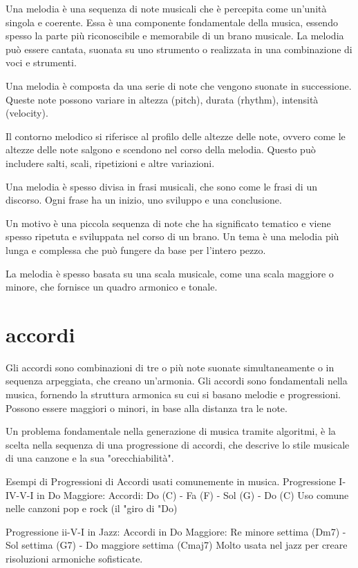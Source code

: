 \documentclass[a4paper,12pt]{report}
\begin{document}
Una melodia è una sequenza di note musicali che è percepita come un'unità singola e coerente. 
Essa è una componente fondamentale della musica, essendo spesso la parte più riconoscibile e memorabile di un brano musicale. 
La melodia può essere cantata, suonata su uno strumento o realizzata in una combinazione di voci e strumenti.

Una melodia è composta da una serie di note che vengono suonate in successione. Queste note possono variare in altezza (pitch), durata (rhythm), intensità (velocity).
 
Il contorno melodico si riferisce al profilo delle altezze delle note, ovvero come le altezze delle note salgono e scendono nel corso della melodia. Questo può includere salti, scali, ripetizioni e altre variazioni.

Una melodia è spesso divisa in frasi musicali, che sono come le frasi di un discorso. Ogni frase ha un inizio, uno sviluppo e una conclusione.

Un motivo è una piccola sequenza di note che ha significato tematico e viene spesso ripetuta e sviluppata nel corso di un brano. Un tema è una melodia più lunga e complessa che può fungere da base per l'intero pezzo.

La melodia è spesso basata su una scala musicale, come una scala maggiore o minore, che fornisce un quadro armonico e tonale.

\section{accordi}

Gli accordi sono combinazioni di tre o più note suonate simultaneamente o in sequenza arpeggiata, che creano un'armonia. Gli accordi sono fondamentali nella musica, fornendo la struttura armonica su cui si basano melodie e progressioni. 
Possono essere maggiori o minori, in base alla distanza tra le note.

Un problema fondamentale nella generazione di musica tramite algoritmi, è la scelta nella sequenza di una progressione di accordi, che descrive lo stile musicale di una canzone e la sua "orecchiabilità".

Esempi di Progressioni di Accordi usati comunemente in musica.
Progressione I-IV-V-I in Do Maggiore:
Accordi: Do (C) - Fa (F) - Sol (G) - Do (C)
Uso comune nelle canzoni pop e rock (il "giro di "Do)

Progressione ii-V-I in Jazz:
Accordi in Do Maggiore: Re minore settima (Dm7) - Sol settima (G7) - Do maggiore settima (Cmaj7)
Molto usata nel jazz per creare risoluzioni armoniche sofisticate.
\end{document}

